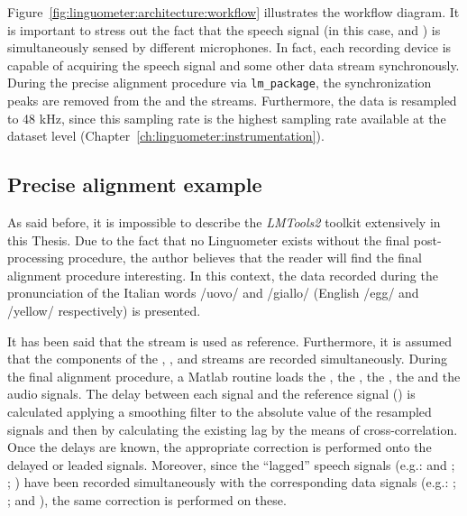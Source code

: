 
Figure~\ref{fig:linguometer:architecture:workflow} illustrates the workflow
diagram. It is important to stress out the fact that the speech signal (in this
case,  and ) is simultaneously sensed by different 
microphones. In fact,
each recording device is capable of acquiring 
the speech signal and some other data stream synchronously.
During the precise alignment procedure via {\tt lm\_package}, the
synchronization peaks are removed from the  and the
 streams.
Furthermore, the data is resampled to 48 kHz, since this sampling rate is the
highest sampling rate available at the dataset level
(Chapter~\ref{ch:linguometer:instrumentation}).

\subsection{Precise alignment example}
As said before, it is impossible to describe the \emph{LMTools2} toolkit
extensively in this Thesis.
Due to the fact that no Linguometer exists without the final post-processing 
procedure, the author believes that the reader will find the final alignment
procedure interesting.
In this context, the data recorded during the pronunciation of the Italian words
/uovo/ and /giallo/ (English /egg/ and /yellow/ respectively) is presented.


It has been said that the  stream is used as reference.
Furthermore, it is assumed that the components of the , ,
 and  streams are recorded simultaneously.
During the final alignment procedure, a Matlab routine loads the
, the , the , the  
and the  audio signals.
The delay between each signal and the reference signal () is 
calculated  applying a smoothing filter to the absolute value of the resampled
signals and then by calculating the existing lag by the means of
cross-correlation.
Once the delays are known, the appropriate correction is performed onto the
delayed or leaded signals.
Moreover, since the ``lagged'' speech signals 
(e.g.:  and ; ; )
have been recorded  simultaneously with the corresponding data signals
(e.g.: ; ;  and ), 
the same correction is performed on these.

